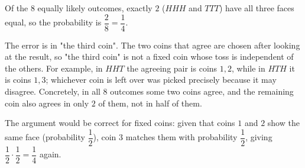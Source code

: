 Of the $8$ equally likely outcomes, exactly $2$ ($HHH$ and $TTT$) have all three faces equal, so the probability is $\dfrac{2}{8}=\boxed{\dfrac{1}{4}}$.

The error is in "the third coin". The two coins that agree are chosen after looking at the result, so "the third coin" is not a fixed coin whose toss is independent of the others. For example, in $HHT$ the agreeing pair is coins $1,2$, while in $HTH$ it is coins $1,3$; whichever coin is left over was picked precisely because it may disagree. Concretely, in all $8$ outcomes some two coins agree, and the remaining coin also agrees in only $2$ of them, not in half of them.

The argument would be correct for fixed coins: given that coins $1$ and $2$ show the same face (probability $\dfrac{1}{2}$), coin $3$ matches them with probability $\dfrac{1}{2}$, giving $\dfrac{1}{2}\cdot\dfrac{1}{2}=\dfrac{1}{4}$ again.
